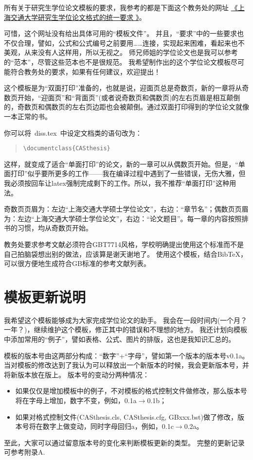 所有关于研究生学位论文模板的要求，我参考的都是下面这个教务处的网址
\href{http://www.gs.sjtu.edu.cn/policy/fileShow.ahtml?id=130}{《上海交通大学研究生学位论文格式的统一要求 》}。

可惜，这个网址没有给出具体可用的“模板文件”。
并且，``要求''中的一些要求也不仅合理，譬如，公式和公式编号之前要用……连接，实现起来困难，看起来也不美观，从来没有人这样用，所以无视之。
师兄师姐的学位论文也是我可以参考的“范本”，尽管这些范本也不是很规范。
我希望制作出的这个学位论文模板尽可能符合教务处的要求，如果有任何建议，欢迎提出！

这个模板是为``双面打印''准备的，也就是说，迎面页总是奇数页，新的一章将从奇数页开始，``迎面页''和``背面页''(或者说奇数页和偶数页)的左右页眉是相互颠倒的，奇数页和偶数页的左右页边距也会被颠倒。通过双面打印得到的学位论文就像一本正常的书。

你可以将~diss.tex~中设定文档类的语句改为：

\begin{quote}
\verb+\documentclass{CASthesis}+
\end{quote}

这样，就变成了适合“单面打印”的论文，新的一章可以从偶数页开始。但是，“单面打印”似乎要所更多的工作——我在编译过程中遇到了一些错误，无伤大雅，但我必须按回车让latex强制完成剩下的工作。所以，我不推荐“单面打印”这种用法。

奇数页页眉为：左边``上海交通大学硕士学位论文''，右边：``章节名''；偶数页页眉为：左边``上海交通大学硕士学位论文''，右边：``论文题目''。每一章的内容按照排书的习惯，均从奇数页开始。

教务处要求参考文献必须符合GBT7714风格，学校明确提出使用这个标准而不是自己拍脑袋想出别的做法，应该算是谢天谢地了。
使用这个模板，结合BibTeX，可以很方便地生成符合GB标准的参考文献列表。

\section{模板更新说明}
\label{sec:update}

我希望这个模板能够成为大家完成学位论文的助手。
我会在一段时间内(一个月？一年？)，继续维护这个模板，修正其中的错误和不理想的地方。
我还计划向模板中添加常用的``例子''，譬如表格、公式、图片的排版，这也是我知识汇总的。

模板的版本号由这两部分构成：``数字''+``字母''，譬如第一个版本的版本号v0.1a。
当对模板的修改达到了我认为可以释放出一个新版本的时候，我会更新版本号，并将新版本放在版上。
版本号的变动分两种情况：

\begin{itemize}
\item 如果仅仅是增加模板中的例子，不对模板的格式控制文件做修改，那么版本号将在字母上增加，数字不变，例如，0.1a$\rightarrow$0.1b；
\item 如果对格式控制文件(CASthesis.cls, CASthesis.cfg, GBxxx.bst)做了修改，版本号将在数字上做变动，同时字母回归a，例如，0.1c$\rightarrow$0.2a。
\end{itemize}
至此，大家可以通过留意版本号的变化来判断模板更新的类型。
完整的更新记录可参考附录A.

